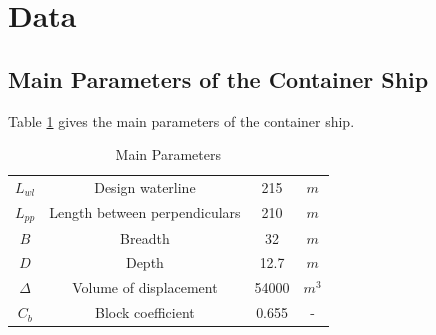 \documentclass[a4paper,UTF8]{article}
\begin{document}
\section{Data}
\subsection{Main Parameters of the Container Ship}
Table \ref{tab:mp} gives the main parameters of the container ship.\\
\begin{table}[!htbp]
	\centering
	\begin{tabular}{cccc}
		\hline
		$L_{wl}$ & Design waterline  & 215 & $m$ \bigstrut\\
		$L_{pp}$ &Length between perpendiculars & 210 & $m$\bigstrut\\
		$ B$ &Breadth   &  32 & $m$ \bigstrut\\
		$ D $ &Depth &   12.7 & $m$ \bigstrut\\
		$ \Delta$ & Volume of displacement &  54000&$m^3$\bigstrut\\
		$C_b$ & Block coefficient    & 0.655 & - \bigstrut\\
		\hline
	\end{tabular}%
	\caption{Main Parameters}
	\label{tab:mp}%
\end{table}%
\end{document}
